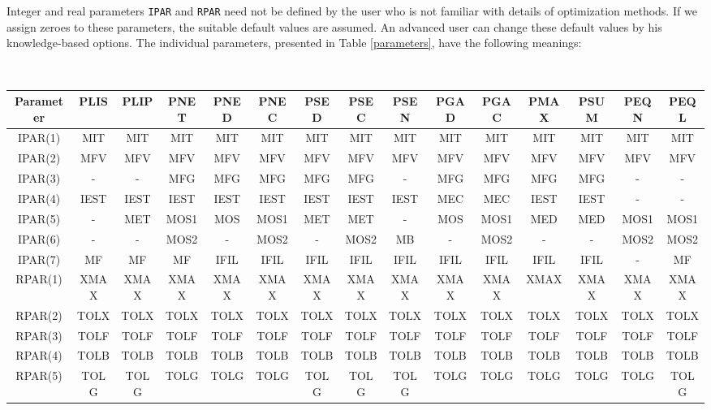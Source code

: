 \documentclass{esub2acm}
\begin{document}
Integer and real parameters {\tt IPAR} and {\tt RPAR} need not be defined by the user
who is not familiar with details of optimization methods. If we assign zeroes to
these parameters, the suitable default values are assumed. An advanced user can
change these default values by his knowledge-based options. The individual parameters,
presented in Table \ref{parameters}, have the following meanings:

\renewcommand{\arraystretch}{1.3}
\setlength{\tabcolsep}{1.3mm}
\begin{table}[h]
\footnotesize
\centering
{\tt
\begin{tabular}{c|*{14}c} \hline
{\rm Parameter} & PLIS & PLIP & PNET & PNED & PNEC & PSED & PSEC & PSEN & PGAD & PGAC & PMAX & PSUM & PEQN & PEQL \\ \hline
IPAR(1) & MIT  & MIT  & MIT  & MIT  & MIT  & MIT  & MIT  & MIT  & MIT  & MIT  & MIT  & MIT  & MIT  & MIT  \\
IPAR(2) & MFV  & MFV  & MFV  & MFV  & MFV  & MFV  & MFV  & MFV  & MFV  & MFV  & MFV  & MFV  & MFV  & MFV  \\
IPAR(3) & -    & -    & MFG  & MFG  & MFG  & MFG  & MFG  & -    & MFG  & MFG  & MFG  & MFG  & -    & -    \\
IPAR(4) & IEST & IEST & IEST & IEST & IEST & IEST & IEST & IEST & MEC  & MEC  & IEST & IEST & -    & -    \\
IPAR(5) & -    & MET  & MOS1 & MOS  & MOS1 & MET  & MET  & -    & MOS  & MOS1 & MED  & MED  & MOS1 & MOS1 \\
IPAR(6) & -    & -    & MOS2 & -    & MOS2 & -    & MOS2 & MB   & -    & MOS2 & -    & -    & MOS2 & MOS2 \\
IPAR(7) & MF   & MF   & MF   & IFIL & IFIL & IFIL & IFIL & IFIL & IFIL & IFIL & IFIL & IFIL & -    & MF   \\ \hline
RPAR(1) & XMAX & XMAX & XMAX & XMAX & XMAX & XMAX & XMAX & XMAX & XMAX & XMAX & XMAX & XMAX & XMAX & XMAX \\
RPAR(2) & TOLX & TOLX & TOLX & TOLX & TOLX & TOLX & TOLX & TOLX & TOLX & TOLX & TOLX & TOLX & TOLX & TOLX \\
RPAR(3) & TOLF & TOLF & TOLF & TOLF & TOLF & TOLF & TOLF & TOLF & TOLF & TOLF & TOLF & TOLF & TOLF & TOLF \\
RPAR(4) & TOLB & TOLB & TOLB & TOLB & TOLB & TOLB & TOLB & TOLB & TOLB & TOLB & TOLB & TOLB & TOLB & TOLB \\
RPAR(5) & TOLG & TOLG & TOLG & TOLG & TOLG & TOLG & TOLG & TOLG & TOLG & TOLG & TOLG & TOLG & TOLG & TOLG \\

\end{tabular}}
\end{table}
\end{document}

